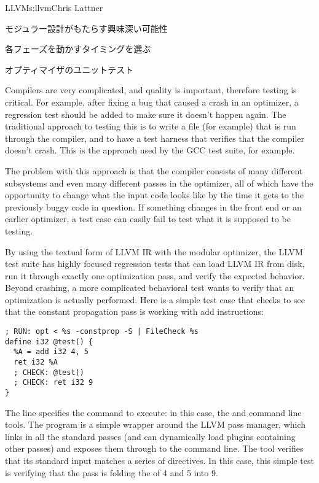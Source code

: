 \begin{aosachapter}{LLVM}{s:llvm}{Chris Lattner}
\begin{aosasect1}{モジュラー設計がもたらす興味深い可能性}
\begin{aosasect2}{各フェーズを動かすタイミングを選ぶ}

\end{aosasect2}

\vspace{-.5cm}
\begin{aosasect2}{オプティマイザのユニットテスト}

Compilers are very complicated, and quality is important, therefore
testing is critical.  For example, after fixing a bug that caused a
crash in an optimizer, a regression test should be added to make sure
it doesn't happen again.  The traditional approach to testing this is
to write a  file (for example) that is run through the
compiler, and to have a test harness that verifies that the compiler
doesn't crash.  This is the approach used by the GCC test suite, for
example.

The problem with this approach is that the compiler consists of many
different subsystems and even many different passes in the optimizer,
all of which have the opportunity to change what the input code looks
like by the time it gets to the previously buggy code in question.  If
something changes in the front end or an earlier optimizer, a test
case can easily fail to test what it is supposed to be testing.

By using the textual form of LLVM IR with the modular optimizer, the
LLVM test suite has highly focused regression tests that can load LLVM
IR from disk, run it through exactly one optimization pass, and verify
the expected behavior.  Beyond crashing, a more complicated behavioral
test wants to verify that an optimization is actually performed.  Here
is a simple test case that checks to see that the constant propagation
pass is working with add instructions:

\begin{verbatim}
; RUN: opt < %s -constprop -S | FileCheck %s
define i32 @test() {
  %A = add i32 4, 5
  ret i32 %A
  ; CHECK: @test()
  ; CHECK: ret i32 9
}
\end{verbatim}

\noindent The  line specifies the command to execute: in this case,
the  and  command line tools.  The
 program is a simple wrapper around the LLVM pass manager,
which links in all the standard passes (and can dynamically load
plugins containing other passes) and exposes them through to the
command line.  The  tool verifies that its standard
input matches a series of  directives.  In this case, this
simple test is verifying that the  pass is folding the
 of 4 and 5 into 9.


\end{aosasect2}
\end{aosasect1}
\end{aosachapter}
